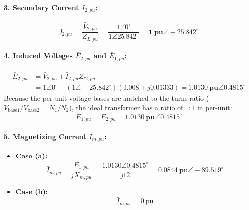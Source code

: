 \paragraph{3. Secondary Current $\bar{I}_{2,pu}$:}
\begin{equation}
    \bar{I}_{2,pu} = \frac{\bar{V}_{2,pu}}{Z_{L,pu}} = \frac{1\angle 0^\circ}{1\angle 25.842^\circ} = \mathbf{1\ \text{pu} \angle -25.842^\circ}
\end{equation}

\paragraph{4. Induced Voltages $\bar{E}_{2,pu}$ and $\bar{E}_{1,pu}$:}
\begin{align}
    \bar{E}_{2,pu} &= \bar{V}_{2,pu} + \bar{I}_{2,pu} Z_{t2,pu} \nonumber\\
                   &= 1\angle 0^\circ + (1\angle -25.842^\circ)(0.008 + j0.01333) = \mathbf{1.0130\ \text{pu} \angle 0.4815^\circ}
\end{align}
Because the per-unit voltage bases are matched to the turns ratio ($V_{\text{base1}}/V_{\text{base2}} = N_1/N_2$), the ideal transformer has a ratio of $1:1$ in per-unit:
\begin{equation}
    \bar{E}_{1,pu} = \bar{E}_{2,pu} = \mathbf{1.0130\ \text{pu} \angle 0.4815^\circ}
\end{equation}

\paragraph{5. Magnetizing Current $\bar{I}_{m,pu}$:}
\begin{itemize}
    \item \textbf{Case (a):}
    \begin{equation}
        \bar{I}_{m,pu} = \frac{\bar{E}_{1,pu}}{jX_{m,pu}} = \frac{1.0130\angle 0.4815^\circ}{j12} = \mathbf{0.0844\ \text{pu} \angle -89.519^\circ}
    \end{equation}
    \item \textbf{Case (b):}
    \begin{equation}
        \bar{I}_{m,pu} = 0\ \text{pu}
    \end{equation}
\end{itemize}

